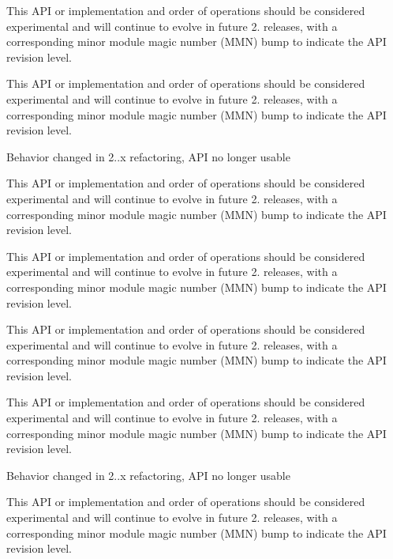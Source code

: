 \begin{DoxyRefList}
This A\+PI or implementation and order of operations should be considered experimental and will continue to evolve in future 2. releases, with a corresponding minor module magic number (M\+MN) bump to indicate the A\+PI revision level. 

This A\+PI or implementation and order of operations should be considered experimental and will continue to evolve in future 2. releases, with a corresponding minor module magic number (M\+MN) bump to indicate the A\+PI revision level. 

Behavior changed in 2..\+x refactoring, A\+PI no longer usable  
\item[\label{bug__bug000003}%
\hypertarget{bug__bug000003}{}%
Global \hyperlink{group__APACHE__CORE__MUTEX_ga354bb6f9a53786fa1259e061ced592e2}{A\+P\+\_\+\+D\+E\+C\+L\+A\+RE} (apr\+\_\+status\+\_\+t) ap\+\_\+parse\+\_\+mutex(const char $\ast$arg]This A\+PI or implementation and order of operations should be considered experimental and will continue to evolve in future 2. releases, with a corresponding minor module magic number (M\+MN) bump to indicate the A\+PI revision level. 

This A\+PI or implementation and order of operations should be considered experimental and will continue to evolve in future 2. releases, with a corresponding minor module magic number (M\+MN) bump to indicate the A\+PI revision level. 

This A\+PI or implementation and order of operations should be considered experimental and will continue to evolve in future 2. releases, with a corresponding minor module magic number (M\+MN) bump to indicate the A\+PI revision level. 

This A\+PI or implementation and order of operations should be considered experimental and will continue to evolve in future 2. releases, with a corresponding minor module magic number (M\+MN) bump to indicate the A\+PI revision level. 

Behavior changed in 2..\+x refactoring, A\+PI no longer usable  
\item[\label{bug__bug000003}%
\hypertarget{bug__bug000003}{}%
Global \hyperlink{group__APACHE__CORE__MUTEX_ga354bb6f9a53786fa1259e061ced592e2}{A\+P\+\_\+\+D\+E\+C\+L\+A\+RE} (apr\+\_\+status\+\_\+t) ap\+\_\+parse\+\_\+mutex(const char $\ast$arg]This A\+PI or implementation and order of operations should be considered experimental and will continue to evolve in future 2. releases, with a corresponding minor module magic number (M\+MN) bump to indicate the A\+PI revision level. 


\end{DoxyRefList}

